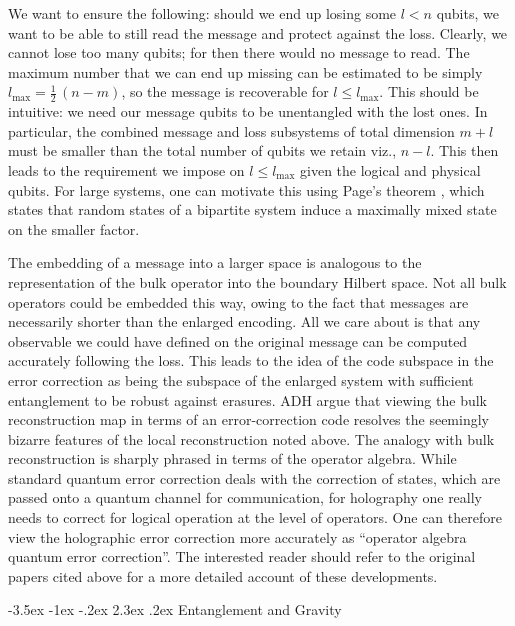 \documentclass[12pt,openany]{book}
\makeatletter
\renewcommand\section{\@startsection {section}{1}{\z@}%
                                   {-3.5ex \@plus -1ex \@minus -.2ex}%
                                   {2.3ex \@plus.2ex}%
                                   {\normalfont\large\bfseries}}
\makeatother
\begin{document}
We want to ensure the following: should we end up losing some $l < n$ qubits, we want to be able to still read the message and protect against the loss.  Clearly, we cannot lose too many qubits; for then there would no message to read. The maximum number that we can end up missing can be estimated to be simply $l_\text{max} = \frac{1}{2}\, (n-m)$, so the message is recoverable for $l \leq l_\text{max}$. This should be intuitive: we need our message qubits to be unentangled with the lost ones. In particular, the combined message and loss subsystems of  total dimension $m+l$ must be smaller than the total number of qubits we retain  viz., $n-l$. This then leads to the requirement we impose on $l \leq l_\text{max}$  given the logical and physical qubits.
 For large systems, one can motivate this using Page's theorem  \cite{Page:1993df}, which states that random states of a bipartite system induce a maximally mixed state on the smaller factor.

The embedding of a message into a larger space is analogous to the representation of the bulk operator into the boundary Hilbert space. Not all bulk operators could be embedded this way, owing to the fact that messages are necessarily shorter than the enlarged encoding. All we care about is that any observable we could have defined on the original message can be computed accurately following the loss. This leads to the idea of the code subspace in the error correction as being the subspace of the enlarged system with sufficient entanglement to be robust against erasures. ADH argue that viewing the bulk reconstruction map in terms of an error-correction code resolves the seemingly bizarre features of the local reconstruction noted above.  The analogy with bulk reconstruction is sharply phrased in terms of the operator algebra. While  standard quantum error correction deals with the correction of states, which are passed onto a quantum channel for communication, for holography one really needs to correct for logical operation at the level of operators. One can therefore view the holographic error correction more accurately as ``operator algebra quantum error correction''.
The interested reader should refer to the original papers cited  above for a more detailed account of these developments.



\section{Entanglement and Gravity}
\label{sec:einstein}
\end{document}
